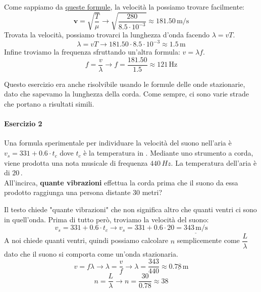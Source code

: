 Come sappiamo da \hyperref[subsec:onde:sper]{queste formule}, la velocità la possiamo trovare
facilmente:
\begin{equation*}
  \boldsymbol{v} = 
  \sqrt{\frac{T}{\mu}} \rightarrow \sqrt{\frac{280}{8.5\cdot 10^{-3}}} \approx\boxed{181.50\,\text{m/s}}
\end{equation*}
Trovata la velocità, possiamo trovarci la lunghezza d'onda facendo $\lambda = vT$.
\begin{equation*}
  \lambda = vT \rightarrow 181.50\cdot 8.5\cdot10^{-3} \approx\boxed{1.5\,\text{m}}
\end{equation*}
Infine troviamo la frequenza sfruttando un'altra formula: $v = \lambda f$.
\begin{equation*}
  f = \frac{v}{\lambda} \rightarrow f = \frac{181.50}{1.5} \approx\boxed{121\, \text{Hz}}
\end{equation*}

Questo esercizio era anche risolvibile usando le formule delle onde stazionarie, dato che sapevamo
la lunghezza della corda. Come sempre, ci sono varie strade che portano a risultati simili.

\paragraph{Esercizio 2}
Una formula sperimentale per individuare la velocità del suono nell'aria è $v_s = 331 +0.6\cdot t_c$
dove $t_c$ è la temperatura in \textcelsius. Mediante uno strumento a corda, viene prodotta una 
nota musicale di frequenza $440\,Hz$. La temperatura dell'aria è di $20\,$\textcelsius.\\
All'incirca, \textbf{quante vibrazioni} effettua la corda prima che il suono da essa prodotto 
raggiunga una persona distante 30 metri?
\divisor

Il testo chiede "quante vibrazioni" che non significa altro che quanti ventri ci sono in quell'onda.
Prima di tutto però, troviamo la velocità del suono:
\begin{equation*}
  v_s = 331 + 0.6\cdot t_c \rightarrow v_s = 331+0.6\cdot20 = \underline{343\,\text{m/s}}
\end{equation*}
A noi chiede quanti ventri, quindi possiamo calcolare $n$ semplicemente come $\dfrac{L}{\lambda}$
dato che il suono si comporta come un'onda stazionaria.
\begin{equation*}
  v = f\lambda \rightarrow \lambda = \frac{v}{f} \rightarrow \lambda = \frac{343}{440} \approx 
  \underline{0.78\,\text{m}}
\end{equation*}
\begin{equation*}
  n = \frac{L}{\lambda} \rightarrow n = \frac{30}{0.78} \approx\boxed{38}
\end{equation*}

